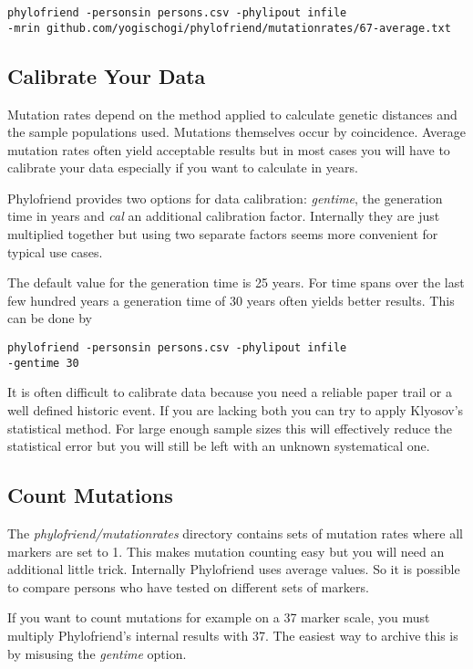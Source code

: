 \noindent\texttt{phylofriend -personsin persons.csv -phylipout infile\\
-mrin github.com/yogischogi/phylofriend/mutationrates/67-average.txt}


\subsection{Calibrate Your Data}

Mutation rates depend on the method applied to calculate
genetic distances and the sample populations used. Mutations
themselves occur by coincidence. Average mutation rates
often yield acceptable results but in most cases you will
have to calibrate your data especially if you want to
calculate in years.

Phylofriend provides two options for data calibration:
\emph{gentime}, the generation time in years and
\emph{cal} an additional calibration factor. Internally
they are just multiplied together but using two separate
factors seems more convenient for typical use cases.

The default value for the generation time is 25 years.
For time spans over the last few hundred years a generation
time of 30 years often yields better results. This can
be done by

\noindent\texttt{phylofriend -personsin persons.csv -phylipout infile\\
-gentime 30}

It is often difficult to calibrate data because you need a
reliable paper trail or a well defined historic event. If
you are lacking both you can try to apply Klyosov's statistical
method\cite{Kly09}. For large enough sample sizes this will
effectively reduce the statistical error but you will still
be left with an unknown systematical one.


\subsection{Count Mutations}

The \emph{phylofriend/mutationrates} directory contains
sets of mutation rates where all markers are set to 1.
This makes mutation counting easy but you will need an
additional little trick. Internally Phylofriend uses
average values. So it is possible to compare persons who
have tested on different sets of markers.

If you want to count mutations for example on a 37 marker
scale, you must multiply Phylofriend's internal results with
37. The easiest way to archive this is by misusing the
\emph{gentime} option. 

